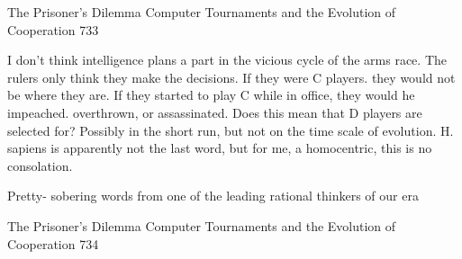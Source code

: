 The Prisoner's Dilemma Computer Tournaments and the Evolution of Cooperation              733

   I don't think intelligence plans a part in the vicious cycle of the arms race. The
   rulers only think they make the decisions. If they were C players. they would not
   be where they are. If they started to play C while in office, they would he
   impeached. overthrown, or assassinated. Does this mean that D players are
   selected for? Possibly in the short run, but not on the time scale of evolution. H.
   sapiens is apparently not the last word, but for me, a homocentric, this is no
   consolation.

Pretty- sobering words from one of the leading rational thinkers of our era




The Prisoner's Dilemma Computer Tournaments and the Evolution of Cooperation         734


